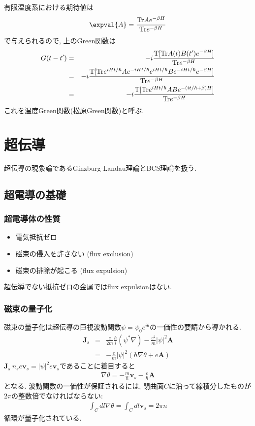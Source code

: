 \documentclass[10.5pt,a4paper]{jreport}
\begin{document}
有限温度系における期待値は
\begin{eqnarray}
  \expval{A} = \frac{{\rm Tr}Ae^{-\beta H}}{{\rm Tr}e^{-\beta H}}
\end{eqnarray}
で与えられるので, 上のGreen関数は
\begin{eqnarray}
  G(t-t') &=& -i\frac{{\rm T}[{\rm Tr}A(t)B(t')e^{-\beta H}]}{{\rm Tr}e^{-\beta H}}\\
  &=& -i\frac{{\rm T}[{\rm Tr}e^{iHt/\hbar}Ae^{-iHt/\hbar}e^{iHt/\hbar}Be^{-iHt/\hbar}e^{-\beta H}]}{{\rm Tr}e^{-\beta H}}\\
  &=& -i\frac{{\rm T}[{\rm Tr}e^{iHt/\hbar}ABe^{-(it/\hbar + \beta)H}]}{{\rm Tr}e^{-\beta H}}
\end{eqnarray}
これを温度Green関数(松原Green関数)と呼ぶ.
\newpage
\chapter{超伝導}
超伝導の現象論であるGinzburg-Landau理論とBCS理論を扱う. 
\section{超電導の基礎}
\subsection{超電導体の性質}
\begin{itemize}
\item 電気抵抗ゼロ
\item 磁束の侵入を許さない (flux exclusion)
\item 磁束の排除が起こる (flux expulsion)
\end{itemize}
超伝導でない抵抗ゼロの金属ではflux expulsionはない.
\subsection{磁束の量子化}
磁束の量子化は超伝導の巨視波動関数$\psi = \psi_0e^{i\theta}$の一価性の要請から導かれる.
\begin{eqnarray}
  \nonumber  \bm{J}_s &=& \frac{e}{2m}\frac{\hbar}{i}(\psi^*\nabla) - \frac{e^2}{m}|\psi|^2\bm{A}\\
  &=& -\frac{e}{m}|\psi|^2(\hbar\nabla\theta + e\bm{A})
\end{eqnarray}
$\bm{J}_s ~ n_se\bm{v}_s = |\psi|^2e\bm{v}_s$であることに着目すると
\begin{eqnarray}
  \nabla\theta = -\frac{m}{\hbar}\bm{v}_s - \frac{e}{\hbar}\bm{A}
\end{eqnarray}
となる. 波動関数の一価性が保証されるには, 閉曲面$C$に沿って線積分したものが$2\pi$の整数倍でなければならない:
\begin{eqnarray}
  \int_C dl \nabla\theta = \int_C dl \bm{v}_s = 2\pi n
\end{eqnarray}
循環が量子化されている.
\end{document}
